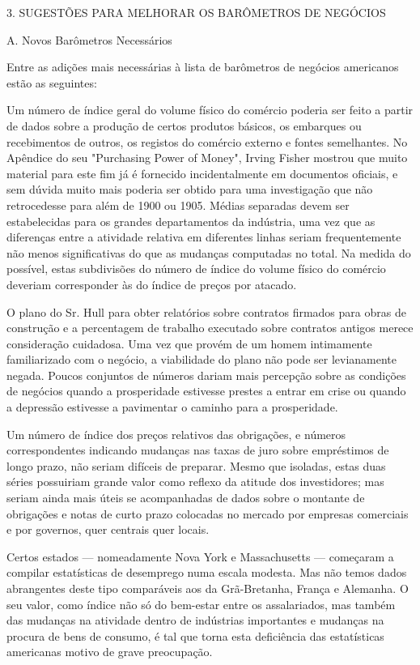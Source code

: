 \documentclass[12pt]{article}
\begin{document}
3. SUGESTÕES PARA MELHORAR OS BARÔMETROS DE NEGÓCIOS

A. Novos Barômetros Necessários

Entre as adições mais necessárias à lista de barômetros de negócios americanos estão as seguintes:

Um número de índice geral do volume físico do comércio poderia ser feito a partir de dados sobre a produção de certos produtos básicos, os embarques ou recebimentos de outros, os registos do comércio externo e fontes semelhantes. No Apêndice do seu "Purchasing Power of Money", Irving Fisher mostrou que muito material para este fim já é fornecido incidentalmente em documentos oficiais, e sem dúvida muito mais poderia ser obtido para uma investigação que não retrocedesse para além de 1900 ou 1905. Médias separadas devem ser estabelecidas para os grandes departamentos da indústria, uma vez que as diferenças entre a atividade relativa em diferentes linhas seriam frequentemente não menos significativas do que as mudanças computadas no total. Na medida do possível, estas subdivisões do número de índice do volume físico do comércio deveriam corresponder às do índice de preços por atacado.

O plano do Sr. Hull para obter relatórios sobre contratos firmados para obras de construção e a percentagem de trabalho executado sobre contratos antigos merece consideração cuidadosa. Uma vez que provém de um homem intimamente familiarizado com o negócio, a viabilidade do plano não pode ser levianamente negada. Poucos conjuntos de números dariam mais percepção sobre as condições de negócios quando a prosperidade estivesse prestes a entrar em crise ou quando a depressão estivesse a pavimentar o caminho para a prosperidade.

Um número de índice dos preços relativos das obrigações, e números correspondentes indicando mudanças nas taxas de juro sobre empréstimos de longo prazo, não seriam difíceis de preparar. Mesmo que isoladas, estas duas séries possuiriam grande valor como reflexo da atitude dos investidores; mas seriam ainda mais úteis se acompanhadas de dados sobre o montante de obrigações e notas de curto prazo colocadas no mercado por empresas comerciais e por governos, quer centrais quer locais.

Certos estados — nomeadamente Nova York e Massachusetts — começaram a compilar estatísticas de desemprego numa escala modesta. Mas não temos dados abrangentes deste tipo comparáveis aos da Grã-Bretanha, França e Alemanha. O seu valor, como índice não só do bem-estar entre os assalariados, mas também das mudanças na atividade dentro de indústrias importantes e mudanças na procura de bens de consumo, é tal que torna esta deficiência das estatísticas americanas motivo de grave preocupação.
\end{document}
